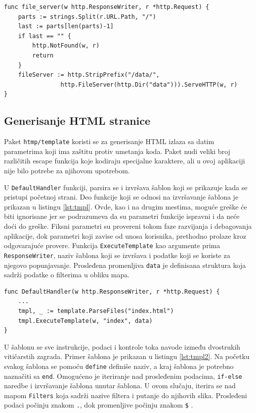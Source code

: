 \documentclass[12pt,oneside]{memoir}
\begin{document}
\begin{center}
\begin{lstlisting}[caption=Hendler za fajl sistem,label={lst:fileserver},  backgroundcolor=\color{background}]
func file_server(w http.ResponseWriter, r *http.Request) {
	parts := strings.Split(r.URL.Path, "/")
	last := parts[len(parts)-1]
	if last == "" {
		http.NotFound(w, r)
		return
	}
	fileServer := http.StripPrefix("/data/", 
				http.FileServer(http.Dir("data"))).ServeHTTP(w, r)
}
\end{lstlisting}
\end{center}

\subsection{Generisanje HTML stranice}

Paket \texttt{htmp/template} koristi se za generisanje HTML izlaza sa datim parametrima koji ima zaštitu protiv umetanja koda. Paket nudi veliki broj različitih escape funkcija koje kodiraju specijalne karaktere, ali u ovoj aplikaciji nije bilo potrebe za njihovom upotrebom. 

U \texttt{DefaultHandler} funkciji, parsira se i izvršava šablon koji se prikazuje kada se pristupi početnoj strani. Deo funkcije koji se odnosi na izvršavanje šablona je prikazan u listingu \ref{lst:tmpl}. Ovde, kao i na drugim mestima, moguće greške će biti ignorisane jer se podrazumeva da su parametri funkcije ispravni i da neće doći do greške. Fiksni parametri su provereni tokom faze razvijanja i debagovanja aplikacije, dok parametri koji zavise od unosa korisnika, prethodno prolaze kroz odgovarajuće provere. Funkcija \texttt{ExecuteTemplate} kao argumente prima \texttt{ResponseWriter}, naziv šablona koji se izvršava i podatke koji se koriste za njegovo popunjavanje. Prosleđena promenljiva \texttt{data} je definisana struktura koja sadrži podatke o filterima u obliku mapa.

\begin{center}
\begin{lstlisting}[caption=Izvršavanje HTML šablona,label={lst:tmpl},  backgroundcolor=\color{background}]
func DefaultHandler(w http.ResponseWriter, r *http.Request) {
	...
	tmpl, _ := template.ParseFiles("index.html")
	tmpl.ExecuteTemplate(w, "index", data)
}
\end{lstlisting}
\end{center}

U šablonu se sve instrukcije, podaci i kontrole toka navode između dvostrukih vitičarstih zagrada. Primer šablona je prikazan u listingu \ref{lst:tmpl2}. Na početku svakog šablona se pomoću \texttt{define} definiše naziv, a kraj šablona je potrebno naznačiti sa \texttt{end}. Omogućeno je iteriranje nad prosleđenim podacima, \texttt{if-else} naredbe i izvršavanje šablona unutar šablona. U ovom slučaju, iterira se nad mapom \texttt{Filters} koja sadrži nazive filtera i putanje do njihovih slika. Prosleđeni podaci počinju znakom \texttt{.}, dok promenljive počinju znakom \texttt{\$} \cite{template}.
\end{document}
